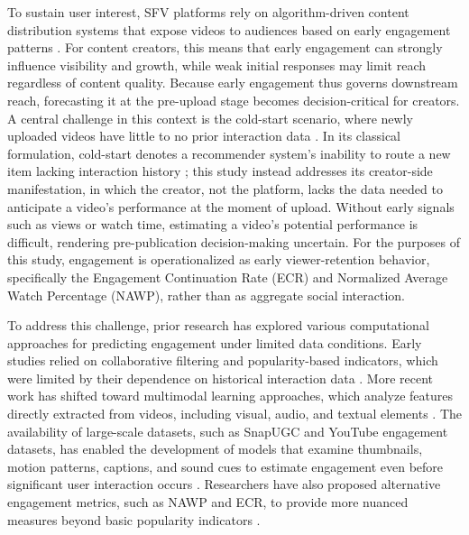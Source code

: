 To sustain user interest, SFV platforms rely on algorithm-driven content distribution systems that expose videos to audiences based on early engagement patterns \cite{covington2016deep}. For content creators, this means that early engagement can strongly influence visibility and growth, while weak initial responses may limit reach regardless of content quality. Because early engagement thus governs downstream reach, forecasting it at the pre-upload stage becomes decision-critical for creators. A central challenge in this context is the cold-start scenario, where newly uploaded videos have little to no prior interaction data \cite{li2024delving}. In its classical formulation, cold-start denotes a recommender system's inability to route a new item lacking interaction history \cite{lika2014facing}; this study instead addresses its creator-side manifestation, in which the creator, not the platform, lacks the data needed to anticipate a video's performance at the moment of upload. Without early signals such as views or watch time, estimating a video's potential performance is difficult, rendering pre-publication decision-making uncertain. For the purposes of this study, engagement is operationalized as early viewer-retention behavior, specifically the Engagement Continuation Rate (ECR) and Normalized Average Watch Percentage (NAWP), rather than as aggregate social interaction.

To address this challenge, prior research has explored various computational approaches for predicting engagement under limited data conditions. Early studies relied on collaborative filtering and popularity-based indicators, which were limited by their dependence on historical interaction data \cite{he2017neural, zhou2010impact}. More recent work has shifted toward multimodal learning approaches, which analyze features directly extracted from videos, including visual, audio, and textual elements \cite{li2024delving, wu2018beyond}. The availability of large-scale datasets, such as SnapUGC and YouTube engagement datasets, has enabled the development of models that examine thumbnails, motion patterns, captions, and sound cues to estimate engagement even before significant user interaction occurs \cite{li2024delving, wu2018beyond}. Researchers have also proposed alternative engagement metrics, such as NAWP and ECR, to provide more nuanced measures beyond basic popularity indicators \cite{li2024delving}.

